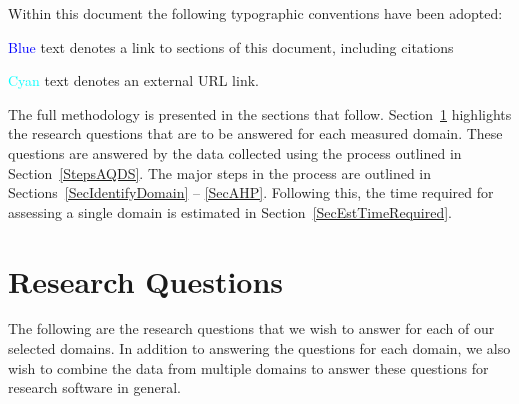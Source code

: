 \documentclass[letterpaper,cleveref]{lipics-v2019}
\begin{document}
Within this document the following typographic conventions have been adopted:
\begin{inparaenum}[i)] 
  \item \textcolor{blue}{Blue} text denotes a link to sections of this document,
  including citations 
  \item \textcolor{cyan}{Cyan} text denotes an external URL link.
\end{inparaenum}

The full methodology is presented in the sections that follow.
Section~\ref{SecResearchQuestions} highlights the research questions that are to
be answered for each measured domain. These questions are answered by the data
collected using the process outlined in Section~\ref{StepsAQDS}.  The major
steps in the process are outlined in Sections~\ref{SecIdentifyDomain} --
\ref{SecAHP}.  Following this, the time required for assessing a single domain
is estimated in Section~\ref{SecEstTimeRequired}.

\section{Research Questions} \label{SecResearchQuestions}

The following are the research questions that we wish to answer for each of our
selected domains.  In addition to answering the questions for each domain, we
also wish to combine the data from multiple domains to answer these questions
for research software in general.
\end{document}
